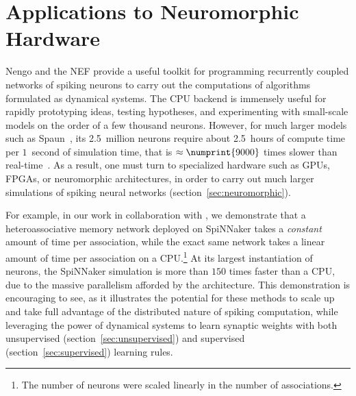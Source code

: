 \chapter{Applications to Neuromorphic Hardware}
\label{chapt:results}

Nengo and the NEF provide a useful toolkit for programming recurrently coupled networks of spiking neurons to carry out the computations of algorithms formulated as dynamical systems.
The CPU backend is immensely useful for rapidly prototyping ideas, testing hypotheses, and experimenting with small-scale models on the order of a few thousand neurons.
However, for much larger models such as Spaun~\citep{eliasmith2012}, its 2.5~million neurons require about 2.5~hours of compute time per $1$~second of simulation time, that is $\approx \numprint{9000}$ times slower than real-time~\citep{stewart2014large, mundy2016real}.
As a result, one must turn to specialized hardware such as GPUs, FPGAs, or neuromorphic architectures, in order to carry out much larger simulations of spiking neural networks (section~\ref{sec:neuromorphic}).

For example, in our work in collaboration with \citet{knight2016}, we demonstrate that a heteroassociative memory network deployed on SpiNNaker takes a \emph{constant} amount of time per association, while the exact same network takes a linear amount of time per association on a CPU.\footnote{%
The number of neurons were scaled linearly in the number of associations.}
At its largest instantiation of  neurons, the SpiNNaker simulation is more than $150$ times faster than a CPU, due to the massive parallelism afforded by the architecture.
This demonstration is encouraging to see, as it illustrates the potential for these methods to scale up and take full advantage of the distributed nature of spiking computation, while leveraging the power of dynamical systems to learn synaptic weights with both unsupervised (section~\ref{sec:unsupervised}) and supervised (section~\ref{sec:supervised}) learning rules.

